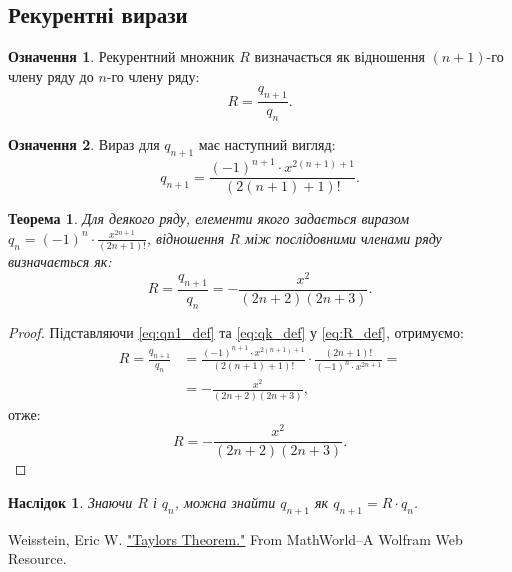 \documentclass[14pt,a4paper,twoside]{extarticle} %
\theoremstyle{definition}
\newtheorem{definition}{Означення}[section] %
\theoremstyle{plain}
\newtheorem{theorem}{Теорема}[section] %
\theoremstyle{plain}
\newtheorem{corollary}{Наслідок}[theorem] %
\begin{document}
	\subsection{Рекурентні вирази}
	
	\begin{definition}
		Рекурентний множник \( R \) визначається як відношення \( (n+1) \)-го члену ряду до \( n \)-го члену ряду:
		\begin{equation} \label{eq:R_def}
			R = \frac{q_{n+1}}{q_n}.
		\end{equation}
	\end{definition}
	
	\begin{definition}
		Вираз для \( q_{n+1} \) має наступний вигляд:
		\begin{equation} \label{eq:qn1_def}
			q_{n+1} = \frac{(-1)^{n+1} \cdot x^{2(n+1)+1}}{(2(n+1) + 1)!}.
		\end{equation}
	\end{definition}
	
	\begin{theorem} \label{thm:ratio_test_result}
		Для деякого ряду, елементи якого задається виразом \(q_n = (-1)^n \cdot \frac{x^{2n+1}}{(2n + 1)!}\), відношення \(R\) між послідовними членами ряду визначається як:
		\[
		R = \frac{q_{n+1}}{q_n} = -\frac{x^2}{(2n + 2)(2n + 3)}.
		\]
	\end{theorem}
	
	\begin{proof}
		Підставляючи \eqref{eq:qn1_def} та \eqref{eq:qk_def} у \eqref{eq:R_def}, отримуємо:
		\begin{align*}
			R = \frac{q_{n+1}}{q_n} &= \frac{(-1)^{n+1} \cdot x^{2(n+1)+1}}{(2(n+1) + 1)!} \cdot \frac{(2n + 1)!}{(-1)^n \cdot x^{2n+1}}= \\
			&= -\frac{x^2}{(2n + 2)(2n + 3)},
		\end{align*}
		отже:
		\begin{equation} \label{eq:R_simplified}
			R = -\frac{x^2}{(2n + 2)(2n + 3)}.
		\end{equation}
	\end{proof}
	
	\begin{corollary}
		Знаючи \( R \) і \( q_n \), можна знайти \( q_{n+1} \) як \( q_{n+1} = R \cdot q_n \).
	\end{corollary}
	
	
	
    \begin{thebibliography}{9}

	 \label{weisstein}
	Weisstein, Eric W. \href{https://mathworld.wolfram.com/TaylorsTheorem.html}{"Taylors Theorem."} From MathWorld--A Wolfram Web Resource.
	\end{thebibliography}
	
	
\end{document}
